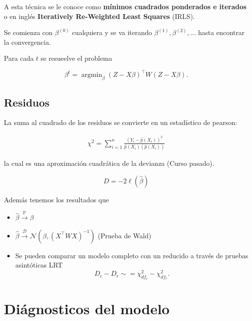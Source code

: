 \documentclass[
  12pt,
]{book}
\providecommand{\tightlist}{%
  \setlength{\itemsep}{0pt}\setlength{\parskip}{0pt}}
\theoremstyle{definition}
\theoremstyle{definition}
\theoremstyle{definition}
\theoremstyle{remark}
\begin{document}
A esta técnica se le conoce como \textbf{mínimos cuadrados ponderados e iterados} o en inglés \textbf{Iteratively Re-Weighted Least Squares} (IRLS).

Se comienza con \(\beta^{(0)}\) cualquiera y se va iterando \(\beta^{(1)}, \beta^{(2)}, \ldots\) hasta encontrar la convergencia.

Para cada \(t\) se resueelve el problema

\begin{equation*}
\beta ^{t} = \operatorname{argmin}_{\beta} (Z-X\beta)^{\top}W(Z-X\beta).
\end{equation*}

\hypertarget{residuos}{%
\subsection{Residuos}\label{residuos}}

La suma al cuadrado de los residuos se convierte en un estadístico de pearson:

\begin{align*}
\chi^{2}=\sum_{i=1}^{n} \frac{\left(Y_{i}-\hat{p}(X_{i})\right)^{2}}{\hat{p}(X_{i})(\hat{p}(X_{i}))}
\end{align*}

la cual es una aproximación cuadrática de la devianza (Curso pasado).

\begin{equation*}
D = -2 \ell(\hat{\beta})
\end{equation*}

Además tenemos los resultados que

\begin{itemize}
\tightlist
\item
  \(\hat{\beta} \xrightarrow{\mathbb{P}} \beta\)
\item
  \(\hat{\beta} \xrightarrow{\mathcal{D}} \mathcal{N}\left(\beta,(X^{\top}WX)^{-1}\right)\) (Prueba de Wald)
\item
  Se pueden comparar un modelo completo con un reducido a través de pruebas asintóticas LRT
  \begin{equation*}
  D_c -D_r \sim =\chi^{2}_{df_{c}} - \chi^{2}_{df_{r}}.
  \end{equation*}
\end{itemize}

\hypertarget{diuxe1gnosticos-del-modelo}{%
\section{Diágnosticos del modelo}\label{diuxe1gnosticos-del-modelo}}
\end{document}
